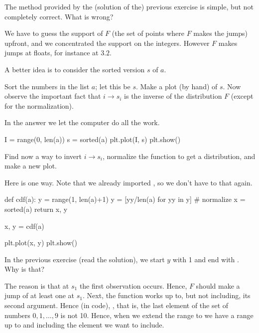 \begin{exercise}\label{ex:2}
  The method provided by the (solution of the) previous exercise is simple, but not completely correct. What is wrong?
  \begin{solution}
    We have to guess the support of $F$ (the set of points where $F$ makes the jumps) upfront, and we concentrated the support on the integers. However $F$ makes jumps at floats, for instance  at $3.2$. 
  \end{solution}
\end{exercise}

A better idea is to consider the sorted version $s$ of $a$. 

\begin{exercise}
  Sort the numbers in the list $a$; let this be $s$.  Make a plot (by hand) of $s$.  Now observe the important fact that $i\to s_i$ is the inverse of the distribution $F$ (except for the normalization).
  \begin{solution}
    In the answer we let the computer do all the work.  

\begin{pyblock}
I = range(0, len(a))
s = sorted(a)
plt.plot(I, s)
plt.show()
\end{pyblock}
  \end{solution}
\end{exercise}

\begin{exercise}
  Find now a way to invert $i\to s_i$, normalize the function to get a distribution, and make a new plot. 
  \begin{solution}
Here is one way. Note that we already imported , so we don't have to that again.
\begin{pyblock}
def cdf(a):  
    y = range(1, len(a)+1)
    y = [yy/len(a) for yy in y] # normalize
    x = sorted(a)
    return x, y

x, y = cdf(a)

plt.plot(x, y)
plt.show()
\end{pyblock}


  \end{solution}
\end{exercise}

\begin{exercise}
In the previous exercise (read the solution), we start $y$ with 1 and end with . Why is that? 
  \begin{solution}
    The reason is that at $s_1$ the first observation occurs. Hence, $F$ should make a jump of at least one at $s_1$. Next, the  function works up to, but not including, its second argument. Hence (in code), , that is, the last element  of the set of numbers $0, 1, \ldots, 9$ is not 10. Hence, when we extend the range to  we have a range up to and including the element we want to include.
  \end{solution}
\end{exercise}

